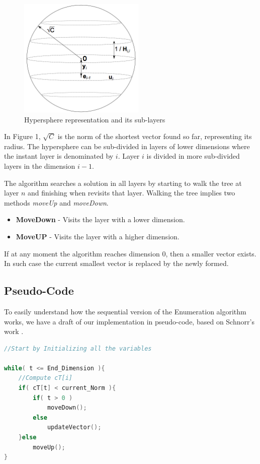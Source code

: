 \documentclass[conference]{IEEEtran}
\begin{document}
\begin{figure}[ht!]
\centering
\includegraphics[width=60mm]{imgSequential/hypersphere.png}
\caption{Hypersphere representation and its sub-layers}
\end{figure}

    In Figure 1, $\sqrt C$ is the norm of the shortest vector found so far, representing its radius. The hypersphere can be sub-divided in layers of lower dimensions where the instant layer is denominated by $i$. Layer $i$ is divided in more sub-divided layers in the dimension $i-1$. 
    
    The algorithm searches a solution in all layers by starting to walk the tree at layer $n$ and finishing when revisits that layer. Walking the tree implies two methods \emph{moveUp} and \emph{moveDown}.

\begin{itemize}
\item \textbf{MoveDown} - Visits the layer with a lower dimension.
\item \textbf{MoveUP} - Visits the layer with a higher dimension.
\end{itemize}

If at any moment the algorithm reaches dimension 0, then a smaller vector exists. In such case the current smallest vector is replaced by the newly formed.

\subsection{Pseudo-Code}
To easily understand how the sequential version of the Enumeration algorithm works, we have a draft of our implementation in pseudo-code, based on Schnorr's work \cite{schnorr}.


\begin{lstlisting}[frame=single,language=C]
//Start by Initializing all the variables

while( t <= End_Dimension ){
    //Compute cT[i]
    if( cT[t] < current_Norm ){
        if( t > 0 )
            moveDown();
        else
            updateVector();
    }else
        moveUp();
}
\end{lstlisting}
\end{document}
